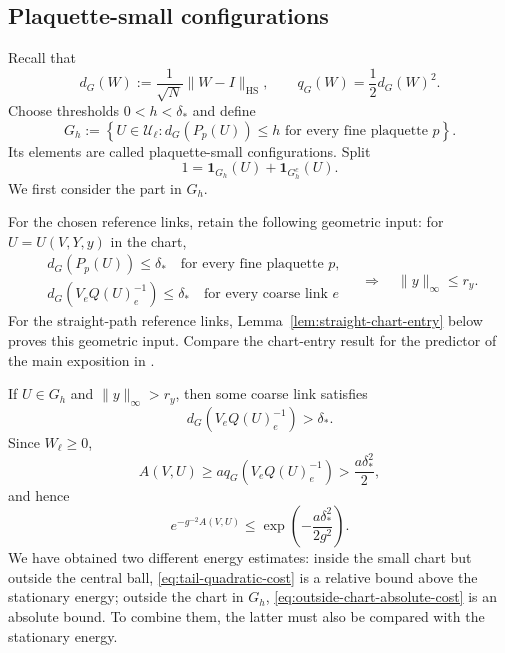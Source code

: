 \documentclass[10pt,reqno]{amsart}
\theoremstyle{definition}
\theoremstyle{remark}
\numberwithin{equation}{section}
\numberwithin{figure}{section}
\begin{document}
\subsection{Plaquette-small configurations}
Recall that
\begin{equation}\label{eq:group-distance-definition}
d_G(W):=\frac1{\sqrt N}\|W-I\|_{\mathrm{HS}},\qquad
q_G(W)=\frac12d_G(W)^2.
\end{equation}
Choose thresholds $0<h<\delta_*$ and define
\begin{equation}\label{eq:plaquette-small-region}
G_h:=\left\{U\in\mathcal U_\ell:
d_G(P_p(U))\le h\text{ for every fine plaquette }p\right\}.
\end{equation}
Its elements are called plaquette-small configurations. Split
\begin{equation}\label{eq:plaquette-region-splitting}
1=\mathbf1_{G_h}(U)+\mathbf1_{G_h^c}(U).
\end{equation}
We first consider the part in $G_h$.

For the chosen reference links, retain the following geometric input:
for $U=U(V,Y,y)$ in the chart,
\begin{equation}\label{eq:geometric-chart-input}
\begin{gathered}
d_G(P_p(U))\le\delta_*\quad\text{for every fine plaquette }p,\\
d_G(V_eQ(U)_e^{-1})\le\delta_*\quad\text{for every coarse link }e
\end{gathered}
\quad\Longrightarrow\quad\|y\|_\infty\le r_y.
\end{equation}
For the straight-path reference links, Lemma~\ref{lem:straight-chart-entry}
below proves this geometric input. Compare the chart-entry result for the
predictor of the main exposition in
\cite[Corollary~14.10, p.~64]{Exposition}.

If $U\in G_h$ and $\|y\|_\infty>r_y$, then some coarse link satisfies
\begin{equation}\label{eq:large-mismatch-witness}
d_G(V_eQ(U)_e^{-1})>\delta_*.
\end{equation}
Since $W_\ell\ge0$,
\begin{equation}\label{eq:outside-chart-absolute-cost}
A(V,U)\ge a q_G(V_eQ(U)_e^{-1})>\frac{a\delta_*^2}{2},
\end{equation}
and hence
\begin{equation}\label{eq:outside-chart-absolute-suppression}
e^{-g^{-2}A(V,U)}\le\exp\left(-\frac{a\delta_*^2}{2g^2}\right).
\end{equation}
We have obtained two different energy estimates: inside the small chart
but outside the central ball, \eqref{eq:tail-quadratic-cost} is a relative
bound above the stationary energy; outside the chart in $G_h$,
\eqref{eq:outside-chart-absolute-cost} is an absolute bound.
To combine them, the latter must also be compared with the stationary energy.
\end{document}

